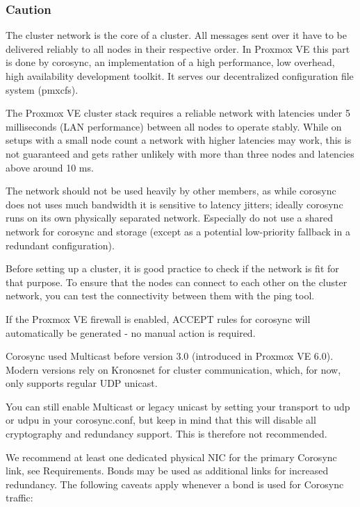 \subsubsection{Caution}

The cluster network is the core of a cluster. All messages sent over it have to be delivered reliably to all nodes in their respective order. In Proxmox VE this part is done by corosync, an implementation of a high performance, low overhead, high availability development toolkit. It serves our decentralized configuration file system (pmxcfs).

The Proxmox VE cluster stack requires a reliable network with latencies under 5 milliseconds (LAN performance) between all nodes to operate stably. While on setups with a small node count a network with higher latencies may work, this is not guaranteed and gets rather unlikely with more than three nodes and latencies above around 10 ms.

The network should not be used heavily by other members, as while corosync does not uses much bandwidth it is sensitive to latency jitters; ideally corosync runs on its own physically separated network. Especially do not use a shared network for corosync and storage (except as a potential low-priority fallback in a redundant configuration).

Before setting up a cluster, it is good practice to check if the network is fit for that purpose. To ensure that the nodes can connect to each other on the cluster network, you can test the connectivity between them with the ping tool.

If the Proxmox VE firewall is enabled, ACCEPT rules for corosync will automatically be generated - no manual action is required.

Corosync used Multicast before version 3.0 (introduced in Proxmox VE 6.0). Modern versions rely on Kronosnet for cluster communication, which, for now, only supports regular UDP unicast.

You can still enable Multicast or legacy unicast by setting your transport to udp or udpu in your corosync.conf, but keep in mind that this will disable all cryptography and redundancy support. This is therefore not recommended.

We recommend at least one dedicated physical NIC for the primary Corosync link, see Requirements. Bonds may be used as additional links for increased redundancy. The following caveats apply whenever a bond is used for Corosync traffic:

